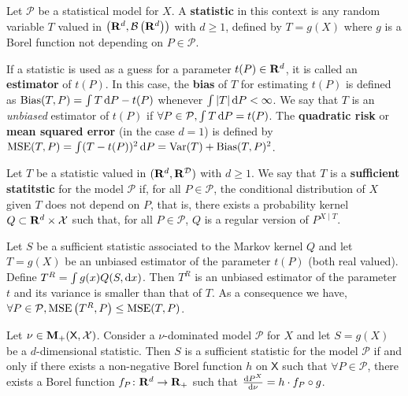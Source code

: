 	\begin{defn}
		Let $\mathcal{P}$ be a statistical model for $X$.
		A \textbf{statistic} in this context is any random variable $T$ valued in $\left(\mathbf{R}^d, \mathcal{B}\left( \mathbf{R}^d \right)\right)$ with $d \geq 1$, defined by $T = g(X)$ where $g$ is a Borel function not depending on $P \in \mathcal{P}$.
	\end{defn}

	If a statistic is used as a guess for a parameter $t(P) \in \mathbf{R}^d$, it is called an \textbf{estimator} of $t(P)$.
	In this case, the \textbf{bias} of $T$ for estimating $t(P)$ is defined as $\operatorname{Bias}(T,P) = \int T \mathop{}\mathopen{}\mathrm{d} P - t(P)$ whenever $\int \left\lvert T\right\rvert \mathop{}\mathopen{}\mathrm{d} P < \infty$.
	We say that $T$ is an \emph{unbiased} estimator of $t(P)$ if $\forall P \in \mathcal{P}, \int T \mathop{}\mathopen{}\mathrm{d} P = t(P)$.
	The \textbf{quadratic risk} or \textbf{mean squared error} (in the case $d = 1$) is defined by $\operatorname{MSE}(T,P) = \int (T - t(P))^2 \mathop{}\mathopen{}\mathrm{d} P = \operatorname{Var}(T) + \operatorname{Bias}(T,P)^2$.

	\begin{defn}
		Let $T$ be a statistic valued in $(\mathbf{R}^d, \mathcal{\mathbf{R}^D})$ with $d \geq 1$.
		We say that $T$ is a \textbf{sufficient statitstic} for the model $\mathcal{P}$ if, for all $P \in \mathcal{P}$, the conditional distribution of $X$ given $T$ does not depend on $P$, that is, there exists a probability kernel $Q \subset \mathbf{R}^d \times \mathcal{X}$ such that, for all $P \in \mathcal{P}$, $Q$ is a regular version of $P^{X \mid T}$.
	\end{defn}

	\begin{lem}
		Let $S$ be a sufficient statistic associated to the Markov kernel $Q$ and let $T = g(X)$ be an unbiased estimator of the parameter $t(P)$ (both real valued).
		Define $T^R = \int g(x) Q(S,\mathop{}\mathopen{}\mathrm{d} x)$.
		Then $T^R$ is an unbiased estimator of the parameter $t$ and its variance is smaller than that of $T$.
		As a consequence we have, $\forall P \in \mathcal{P}, \operatorname{MSE} \left( T^R, P \right) \leq \operatorname{MSE} (T,P)$.
	\end{lem}

	\begin{thm}
		Let $\nu \in \mathbf{M}_+(\mathsf{X},\mathcal{X})$.
		Consider a $\nu$-dominated model $\mathcal{P}$ for $X$ and let $S = g(X)$ be a $d$-dimensional statistic.
		Then $S$ is a sufficient statistic for the model $\mathcal{P}$ if and only if there exists a non-negative Borel function $h$ on $\mathsf{X}$ such that $\forall P \in \mathcal{P}$, there exists a Borel function $f_P \colon \mathbf{R}^d \to \mathbf{R}_+$ such that $\frac{\mathop{}\mathopen{}\mathrm{d} P^X}{\mathop{}\mathopen{}\mathrm{d} \nu} = h \cdot f_P \circ g$.
	\end{thm}
	
